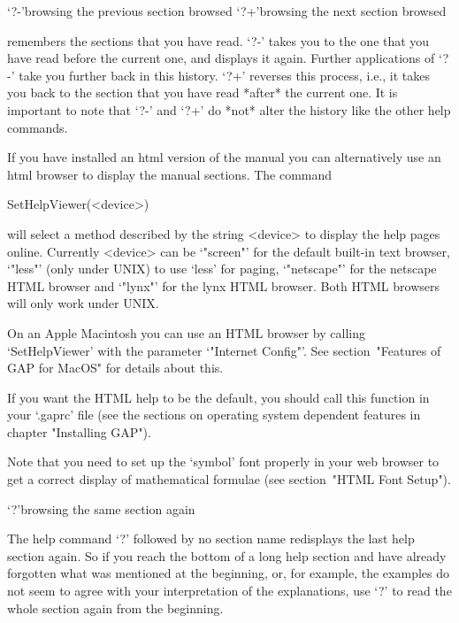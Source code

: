 \>`?-'{browsing the previous section browsed}
\>`?+'{browsing the next section browsed}

{\GAP} remembers the sections that you have read. `?-' takes you to the
one that you have read before the current one, and displays it again.
Further applications of `?-' take you further back in this history. `?+' reverses this
process, i.e., it takes you back to the section that you have read
*after* the current one. It is important to note that `?-' and `?+' do
*not* alter the history like the other help commands.




If you have installed an html version of the manual you can
alternatively use an html browser to display the manual sections. The
command

\>SetHelpViewer(<device>)

will select a method described by the string <device> to display the help
pages online. Currently <device> can be `"screen"' for the default built-in
text browser, `"less"' (only under UNIX) to use `less' for paging,
`"netscape"' for the netscape HTML browser and `"lynx"' for the
lynx HTML browser. Both HTML browsers will only work under UNIX. 

On an Apple Macintosh you can use an HTML browser by calling `SetHelpViewer'
with the parameter `"Internet Config"'.
See section~"Features of GAP for MacOS" for details about this.

If you want the HTML help to be the default, you should call this function
in your `.gaprc' file (see the sections on operating
system dependent features in chapter "Installing GAP").

Note that you need to set up the `symbol' font properly in your web browser
to get a correct display of mathematical formulae (see section~"HTML Font
Setup").



\>`?'{browsing the same section again}

The help command `?' followed by no section name redisplays the last help
section again. So if you reach the bottom of a long help section and have
already forgotten what was mentioned at the beginning, or, for example, the
examples do not seem to agree with your interpretation of the
explanations, use `?' to read the whole section again from the beginning.

